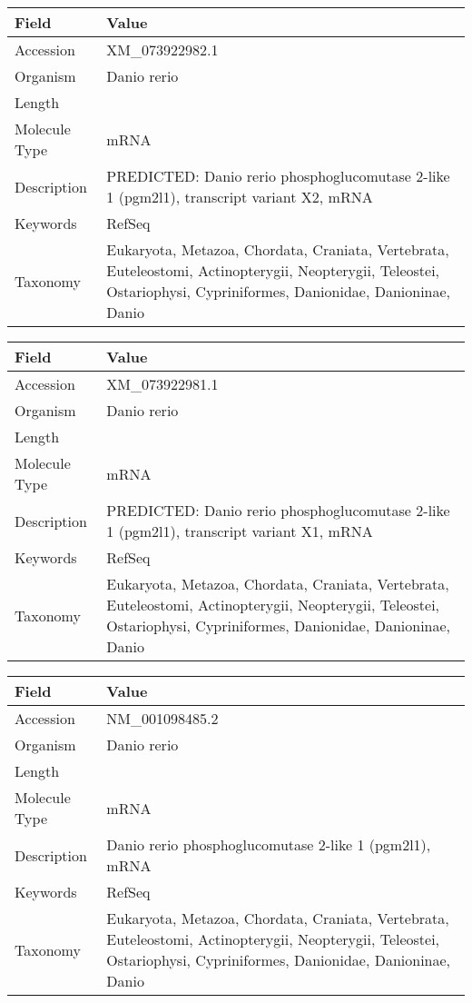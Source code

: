 \documentclass[10pt]{article}
\begin{document}
\vspace{1em}
{\footnotesize
\begin{longtable}{>{\raggedright\arraybackslash}p{4.5cm} >{\raggedright\arraybackslash}p{11.5cm}}
\textbf{Field} & \textbf{Value} \\
\hline
Accession & XM\_073922982.1 \\
Organism & Danio rerio \\
Length & 6382 \\
Molecule Type & mRNA \\
Description & PREDICTED: Danio rerio phosphoglucomutase 2-like 1 (pgm2l1), transcript variant X2, mRNA \\
Keywords & RefSeq \\
Taxonomy & Eukaryota, Metazoa, Chordata, Craniata, Vertebrata, Euteleostomi, Actinopterygii, Neopterygii, Teleostei, Ostariophysi, Cypriniformes, Danionidae, Danioninae, Danio \\
\end{longtable}
}

\vspace{1em}
{\footnotesize
\begin{longtable}{>{\raggedright\arraybackslash}p{4.5cm} >{\raggedright\arraybackslash}p{11.5cm}}
\textbf{Field} & \textbf{Value} \\
\hline
Accession & XM\_073922981.1 \\
Organism & Danio rerio \\
Length & 3789 \\
Molecule Type & mRNA \\
Description & PREDICTED: Danio rerio phosphoglucomutase 2-like 1 (pgm2l1), transcript variant X1, mRNA \\
Keywords & RefSeq \\
Taxonomy & Eukaryota, Metazoa, Chordata, Craniata, Vertebrata, Euteleostomi, Actinopterygii, Neopterygii, Teleostei, Ostariophysi, Cypriniformes, Danionidae, Danioninae, Danio \\
\end{longtable}
}

\vspace{1em}
{\footnotesize
\begin{longtable}{>{\raggedright\arraybackslash}p{4.5cm} >{\raggedright\arraybackslash}p{11.5cm}}
\textbf{Field} & \textbf{Value} \\
\hline
Accession & NM\_001098485.2 \\
Organism & Danio rerio \\
Length & 3342 \\
Molecule Type & mRNA \\
Description & Danio rerio phosphoglucomutase 2-like 1 (pgm2l1), mRNA \\
Keywords & RefSeq \\
Taxonomy & Eukaryota, Metazoa, Chordata, Craniata, Vertebrata, Euteleostomi, Actinopterygii, Neopterygii, Teleostei, Ostariophysi, Cypriniformes, Danionidae, Danioninae, Danio \\
\end{longtable}
}
\end{document}
